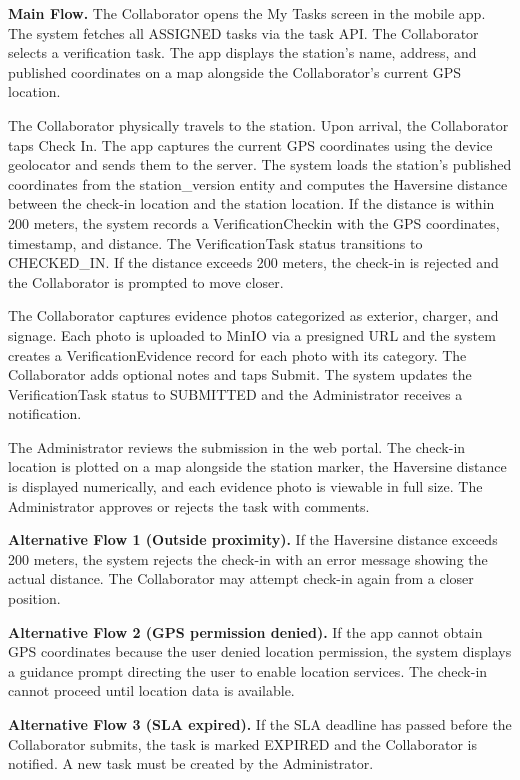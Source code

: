 \documentclass[../Main.tex]{subfiles}
\begin{document}
\textbf{Main Flow.} The Collaborator opens the My Tasks screen in the mobile app. The system fetches all ASSIGNED tasks via the task API. The Collaborator selects a verification task. The app displays the station's name, address, and published coordinates on a map alongside the Collaborator's current GPS location.

The Collaborator physically travels to the station. Upon arrival, the Collaborator taps Check In. The app captures the current GPS coordinates using the device geolocator and sends them to the server. The system loads the station's published coordinates from the station_version entity and computes the Haversine distance between the check-in location and the station location. If the distance is within 200 meters, the system records a VerificationCheckin with the GPS coordinates, timestamp, and distance. The VerificationTask status transitions to CHECKED_IN. If the distance exceeds 200 meters, the check-in is rejected and the Collaborator is prompted to move closer.

The Collaborator captures evidence photos categorized as exterior, charger, and signage. Each photo is uploaded to MinIO via a presigned URL and the system creates a VerificationEvidence record for each photo with its category. The Collaborator adds optional notes and taps Submit. The system updates the VerificationTask status to SUBMITTED and the Administrator receives a notification.

The Administrator reviews the submission in the web portal. The check-in location is plotted on a map alongside the station marker, the Haversine distance is displayed numerically, and each evidence photo is viewable in full size. The Administrator approves or rejects the task with comments.

\textbf{Alternative Flow 1 (Outside proximity).} If the Haversine distance exceeds 200 meters, the system rejects the check-in with an error message showing the actual distance. The Collaborator may attempt check-in again from a closer position.

\textbf{Alternative Flow 2 (GPS permission denied).} If the app cannot obtain GPS coordinates because the user denied location permission, the system displays a guidance prompt directing the user to enable location services. The check-in cannot proceed until location data is available.

\textbf{Alternative Flow 3 (SLA expired).} If the SLA deadline has passed before the Collaborator submits, the task is marked EXPIRED and the Collaborator is notified. A new task must be created by the Administrator.
\end{document}
